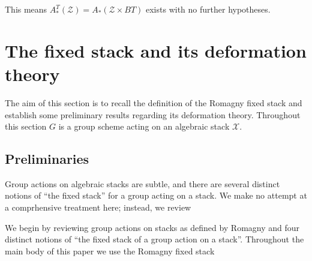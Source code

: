 \documentclass[12pt,dvipsnames]{amsart}
\begin{document}
This means \(A^T_*(\mathcal Z) = A_*(\mathcal Z\times BT)\) exists with no further hypotheses.

\section{The fixed stack and its deformation theory}

The aim of this section is to recall the definition of the Romagny fixed stack and establish some preliminary results regarding its deformation theory. Throughout this section \(G\) is a group scheme acting on an algebraic stack \(\mathcal X\).

\subsection{Preliminaries}
Group actions on algebraic stacks are subtle, and there are several distinct notions of ``the fixed stack'' for a group acting on a stack. We make no attempt at a comprhensive treatment here; instead, we review 

We begin by reviewing group actions on stacks as defined by Romagny \cite{romagny_GroupActionsStacks2005} and four distinct notions of ``the fixed stack of a group action on a stack''. Throughout the main body of this paper we use the Romagny fixed stack
\end{document}
